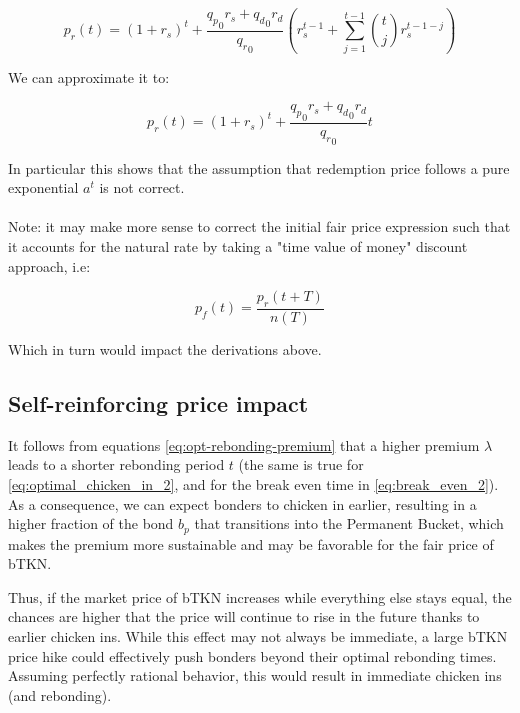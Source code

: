 \documentclass{article}
\begin{document}
\begin{equation}
  \label{eq:conservative_p_r_base_2_a}
p_r(t) = (1+r_s)^t + \frac{{q_p}_0 r_s + {q_d}_0 r_d}{{q_r}_0} \left(r_s^{t-1} + \sum_{j=1}^{t-1} \binom{t}{j} r_s^{t-1-j} \right)
\end{equation}

We can approximate it to:

\begin{equation}
  \label{eq:conservative_p_r_base_2_b}
p_r(t) = (1+r_s)^t + \frac{{q_p}_0 r_s + {q_d}_0 r_d}{{q_r}_0} t
\end{equation}

In particular this shows that the assumption that redemption price follows a pure exponential $a^t$ is not correct.

\paragraph{}

Note: it may make more sense to correct the initial fair price expression such that it accounts for the natural rate by taking a "time value of money" discount approach, i.e:

\begin{equation}
  \label{eq:conservative-1}
p_f(t) = \frac{p_r(t + T)}{n(T)}
\end{equation}

Which in turn would impact the derivations above.

\subsection{Self-reinforcing price impact}
It follows from equations \ref{eq:opt-rebonding-premium} that a higher premium $\lambda$ leads to a shorter rebonding period $t$ (the same is true for \ref{eq:optimal_chicken_in_2}, and for the break even time in \ref{eq:break_even_2}). As a consequence, we can expect bonders to chicken in earlier, resulting in a higher fraction of the bond $b_p$ that transitions into the Permanent Bucket, which makes the premium more sustainable and may be favorable for the fair price of bTKN.

Thus, if the market price of bTKN increases while everything else stays equal, the chances are higher that the price will continue to rise in the future thanks to earlier chicken ins. While this effect may not always be immediate, a large bTKN price hike could effectively push bonders beyond their optimal rebonding times.
Assuming perfectly rational behavior, this would result in immediate chicken ins (and rebonding).
\end{document}
